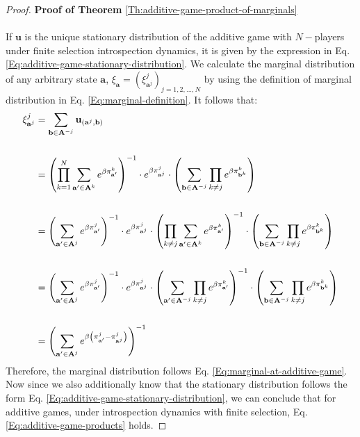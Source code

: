 \documentclass[11pt]{article}
\theoremstyle{plainCl1}
\theoremstyle{plainCl2}
\newcommand{\A}{\mathbf{A}}
\newcommand{\abf}{\mathbf{a}}
\newcommand{\ubf}{\mathbf{u}}
\begin{document}
\begin{proof}
\textbf{Proof of Theorem} \ref{Th:additive-game-product-of-marginals} \\ \\ 
If $\ubf$ is the unique stationary distribution of the additive game with $N-$players under finite selection introspection dynamics, it is given by the expression in Eq. \ref{Eq:additive-game-stationary-distribution}. We calculate the marginal distribution of any arbitrary state $\abf$, $\xi_{\abf} = (\xi^j_{\abf^j})_{j = 1,2,...,N}$ by using the definition of marginal distribution in Eq. \ref{Eq:marginal-definition}. It follows that: 
\begin{align}
\xi^j_{\abf^j} &= \sum_{\mathbf{b} \in \A^{-j}} \ubf_{(\abf^j,\mathbf{b})} \\ \notag \\
&= \left( \prod_{k=1}^N \sum_{\abf' \in \A^k} \displaystyle e^{\beta \pi^k_{\abf'}}\right)^{-1} \cdot \displaystyle e^{\beta \pi^j_{\abf^j}} \cdot \left( \sum_{\mathbf{b} \in \A^{-j}} \prod_{k \neq j} e^{\beta \pi^k_{\mathbf{b}^k}} \right) \\ \notag \\
&= \left( \sum_{\abf' \in \A^j} \displaystyle e^{\beta \pi^j_{\abf'}}\right)^{-1} \cdot \displaystyle e^{\beta \pi^j_{\abf^j}} \cdot \left( \prod_{k\neq j} \sum_{\abf' \in \A^k} \displaystyle e^{\beta \pi^k_{\abf'}}\right)^{-1} \cdot \left( \sum_{\mathbf{b} \in \A^{-j}} \prod_{k \neq j} e^{\beta \pi^k_{\mathbf{b}^k}} \right) \\ \notag \\ 
&= \left( \sum_{\abf' \in \A^j} \displaystyle e^{\beta \pi^j_{\abf'}}\right)^{-1} \cdot \displaystyle e^{\beta \pi^j_{\abf^j}} \cdot \left( \sum_{\abf' \in \A^{-j}} \prod_{k\neq j}  \displaystyle e^{\beta \pi^k_{\abf'}}\right)^{-1} \cdot \left( \sum_{\mathbf{b} \in \A^{-j}} \prod_{k \neq j} e^{\beta \pi^k_{\mathbf{b}^k}} \right) \\ \notag \\ 
&= \left( \sum_{\abf' \in \A^j} \displaystyle e^{\beta \left( \pi^j_{\abf'} - \pi^j_{\abf^j}\right)}\right)^{-1}
\end{align}
\noindent Therefore, the marginal distribution follows Eq.  \ref{Eq:marginal-at-additive-game}. Now since we also additionally know that the stationary distribution follows the form Eq. \ref{Eq:additive-game-stationary-distribution}, we can conclude that for additive games, under introspection dynamics with finite selection, Eq. \ref{Eq:additive-game-products} holds. 
\end{proof}
\end{document}
